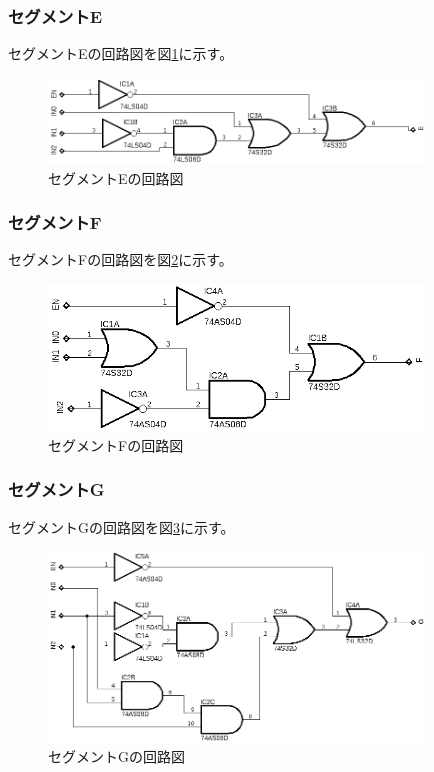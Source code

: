 \documentclass[a4paper,11pt,dvipdfmx]{jsarticle}
\begin{document}
\subsubsection{セグメントE}
セグメントEの回路図を図\ref{fig:segmentE}に示す。
\begin{figure}[H]
  \centering
  \includegraphics[width=10cm]{./images/E.png}
  \caption{セグメントEの回路図}
  \label{fig:segmentE}
\end{figure}

\subsubsection{セグメントF}
セグメントFの回路図を図\ref{fig:segmentF}に示す。
\begin{figure}[H]
  \centering
  \includegraphics[width=10cm]{./images/F.png}
  \caption{セグメントFの回路図}
  \label{fig:segmentF}
\end{figure}

\subsubsection{セグメントG}
セグメントGの回路図を図\ref{fig:segmentG}に示す。
\begin{figure}[H]
  \centering
  \includegraphics[width=10cm]{./images/G.png}
  \caption{セグメントGの回路図}
  \label{fig:segmentG}
\end{figure}
\end{document}
